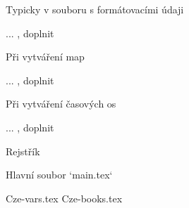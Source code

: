 \secc Typicky v souboru s formátovacími údaji

... \TODO, doplnit

\secc Při vytváření map

... \TODO, doplnit

\secc Při vytváření časových os

... \TODO, doplnit




\sec Rejstřík

\def\_sortinglang{en}
\typosize[9/]
\makeindex
\endmulti

\bye





 Hlavní soubor `main.tex`

\begtt
\load[opbible]  %
\cslang

\def\shadowparameter{.1}%



\def\tmark     {BKR}    %

 {Cze-vars.tex}   %
 {Cze-books.tex}  %

\def\txsfile     {sources/Cze\tmark-\bmark.txs}     %
\def\fmtfile     {formats/fmt-Cze\tmark-\amark.tex} %
\def\notesfile   {notes/notes-\amark.tex}           %
\def\introfile   {others/intro-\amark.tex}          %
\def\articlefile {others/articles-\amark.tex}       %

